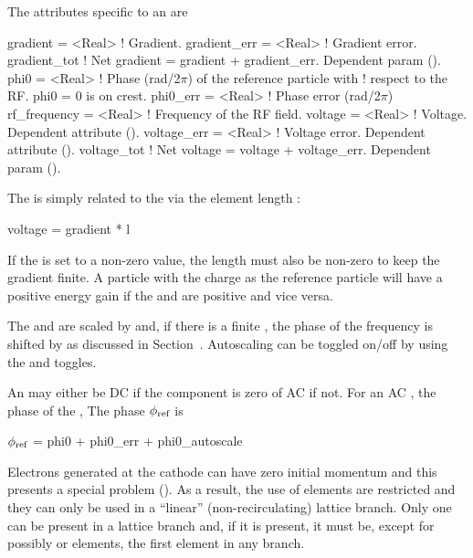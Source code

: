 The attributes specific to an  are 
\begin{example}
  gradient       = <Real>    ! Gradient.
  gradient_err   = <Real>    ! Gradient error.
  gradient_tot               ! Net gradient = gradient + gradient_err. Dependent param ().
  phi0           = <Real>    ! Phase (rad/2\(\pi\)) of the reference particle with 
                             !   respect to the RF. phi0 = 0 is on crest.
  phi0_err       = <Real>    ! Phase error (rad/2\(\pi\))
  rf_frequency   = <Real>    ! Frequency of the RF field.
  voltage        = <Real>    ! Voltage. Dependent attribute (). 
  voltage_err    = <Real>    ! Voltage error. Dependent attribute (). 
  voltage_tot                ! Net voltage = voltage + voltage_err. Dependent param ().
\end{example}

The  is simply related to the  via the element length :
\begin{example}
  voltage = gradient * l
\end{example}
If the  is set to a non-zero value, the length  must also be non-zero to keep the
gradient finite.  A particle with the charge as the reference particle will have a positive energy
gain if the  and  are positive and vice versa.

The  and  are scaled by  and, if there is a
finite , the phase of the frequency is shifted by  as
discussed in Section~. Autoscaling can be toggled on/off by using the
 and  toggles.

An  may either be DC if the  component is zero of AC if
not. For an AC , the phase of the , The phase $\phi_{\text{ref}}$
is 
\begin{example} 
  \(\phi_{\text{ref}}\) = phi0 + phi0_err + phi0_autoscale 
\end{example}

Electrons generated at the cathode can have zero initial momentum and
this presents a special problem (). As a result, the
use of  elements are restricted and they can only be used in
a ``linear'' (non-recirculating) lattice branch. Only one 
can be present in a lattice branch and, if it is present, it must be,
except for possibly  or  elements, the first
element in any branch.
 
